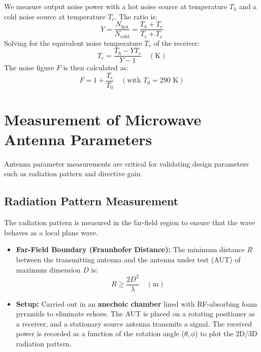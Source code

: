 \documentclass[12pt,a4paper]{article}
\begin{document}
\begin{tcolorbox}[formulabox, title={\textbf{Y-Factor Method Equations}}]
We measure output noise power with a hot noise source at temperature $T_h$ and a cold noise source at temperature $T_c$. The ratio is:
\begin{equation}
  Y = \frac{N_{\text{hot}}}{N_{\text{cold}}} = \frac{T_h + T_e}{T_c + T_e}
\end{equation}
Solving for the equivalent noise temperature $T_e$ of the receiver:
\begin{equation}
  T_e = \frac{T_h - Y T_c}{Y - 1} \quad (\text{K})
\end{equation}
The noise figure $F$ is then calculated as:
\begin{equation}
  F = 1 + \frac{T_e}{T_0} \quad (\text{with } T_0 = 290\text{ K})
\end{equation}
\end{tcolorbox}

\section{Measurement of Microwave Antenna Parameters}

Antenna parameter measurements are critical for validating design parameters such as radiation pattern and directive gain.

\subsection{Radiation Pattern Measurement}
The radiation pattern is measured in the far-field region to ensure that the wave behaves as a local plane wave.
\begin{itemize}[leftmargin=*, itemsep=3pt]
  \item \textbf{Far-Field Boundary (Fraunhofer Distance):} The minimum distance $R$ between the transmitting antenna and the antenna under test (AUT) of maximum dimension $D$ is:
    \begin{equation}
      R \ge \frac{2 D^2}{\lambda} \quad (\text{m})
    \end{equation}
  \item \textbf{Setup:} Carried out in an \textbf{anechoic chamber} lined with RF-absorbing foam pyramids to eliminate echoes. The AUT is placed on a rotating positioner as a receiver, and a stationary source antenna transmits a signal. The received power is recorded as a function of the rotation angle ($\theta, \phi$) to plot the 2D/3D radiation pattern.
\end{itemize}
\end{document}
